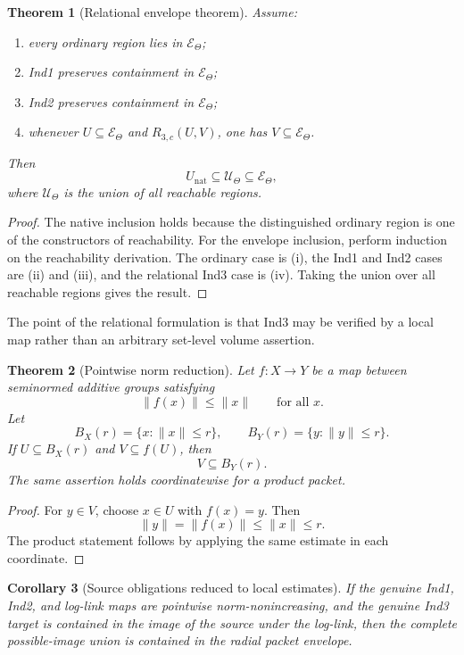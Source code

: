 \documentclass[11pt]{amsart}
\newtheorem{theorem}{Theorem}[section]
\newtheorem{corollary}[theorem]{Corollary}
\theoremstyle{definition}
\theoremstyle{remark}
\newcommand{\ThetaOut}{\mathcal U_{\Theta}}
\newcommand{\ThetaEnv}{\mathcal E_{\Theta}}
\begin{document}
\begin{theorem}[Relational envelope theorem]\label{thm:relational-envelope}
Assume:
\begin{enumerate}[label=(\roman*)]
\item every ordinary region lies in $\ThetaEnv$;
\item Ind1 preserves containment in $\ThetaEnv$;
\item Ind2 preserves containment in $\ThetaEnv$;
\item whenever $U\subseteq\ThetaEnv$ and $R_{3,c}(U,V)$, one has
$V\subseteq\ThetaEnv$.
\end{enumerate}
Then
\[
 U_{\mathrm{nat}}\subseteq\ThetaOut
 \subseteq\ThetaEnv,
\]
where $\ThetaOut$ is the union of all reachable regions.
\end{theorem}

\begin{proof}
The native inclusion holds because the distinguished ordinary region is one
of the constructors of reachability.  For the envelope inclusion, perform
induction on the reachability derivation.  The ordinary case is (i), the Ind1
and Ind2 cases are (ii) and (iii), and the relational Ind3 case is (iv).
Taking the union over all reachable regions gives the result.
\end{proof}

The point of the relational formulation is that Ind3 may be verified by a
local map rather than an arbitrary set-level volume assertion.

\begin{theorem}[Pointwise norm reduction]\label{thm:norm-reduction}
Let $f:X\to Y$ be a map between seminormed additive groups satisfying
\[
 \|f(x)\|\le\|x\|\qquad\text{for all }x.
\]
Let
\[
 B_X(r)=\{x:\|x\|\le r\},
 \qquad
 B_Y(r)=\{y:\|y\|\le r\}.
\]
If $U\subseteq B_X(r)$ and $V\subseteq f(U)$, then
\[
 V\subseteq B_Y(r).
\]
The same assertion holds coordinatewise for a product packet.
\end{theorem}

\begin{proof}
For $y\in V$, choose $x\in U$ with $f(x)=y$.  Then
\[
 \|y\|=\|f(x)\|\le\|x\|\le r.
\]
The product statement follows by applying the same estimate in each
coordinate.
\end{proof}

\begin{corollary}[Source obligations reduced to local estimates]
If the genuine Ind1, Ind2, and log-link maps are pointwise
norm-nonincreasing, and the genuine Ind3 target is contained in the image of
the source under the log-link, then the complete possible-image union is
contained in the radial packet envelope.
\end{corollary}
\end{document}
